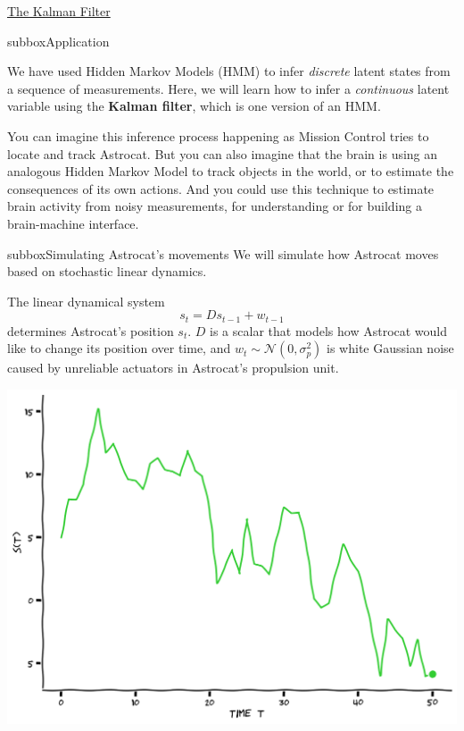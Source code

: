 \begin{textbox}{\href{http://instructor.compneuro.neuromatch.io/tutorials/W3D2_HiddenDynamics/instructor/W3D2_Tutorial3.html}{The Kalman Filter }   }

\begin{subbox}{subbox}{Application}
\scriptsize

We have used Hidden Markov Models (HMM) to infer \textit{discrete} latent states from a sequence of measurements. Here, we will learn how to infer a \textit{continuous} latent variable using the \textbf{Kalman filter}, which is one version of an HMM.

You can imagine this inference process happening as Mission Control tries to locate and track Astrocat. But you can also imagine that the brain is using an analogous Hidden Markov Model to track objects in the world, or to estimate the consequences of its own actions. And you could use this technique to estimate brain activity from noisy measurements, for understanding or for building a brain-machine interface.

\end{subbox}
\begin{subbox}{subbox}{Simulating Astrocat's movements}
\scriptsize
We will simulate how Astrocat moves based on stochastic linear dynamics.

The linear dynamical system 
$$ s_t = Ds_{t-1} + w_{t-1}$$
determines Astrocat's position $s_t$. $D$ is a scalar that models how Astrocat would like to change its position over time, and $w_t \sim \mathcal{N}(0, \sigma_p^2)$ is white Gaussian noise caused by unreliable actuators in Astrocat's propulsion unit. 

\begin{center}
    
\includegraphics[scale=0.2]{Figures/HD/HD_Figure6.png}
\end{center}


\end{subbox}
\end{textbox}
